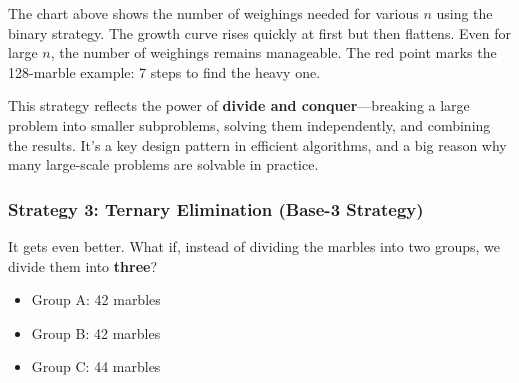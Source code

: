 \begin{center}
\end{center}

\noindent The chart above shows the number of weighings needed for various \( n \) using the binary strategy. The growth curve rises quickly at first but then flattens. Even for large \( n \), the number of weighings remains manageable. The red point marks the 128-marble example: 7 steps to find the heavy one.

\medskip

This strategy reflects the power of \textbf{divide and conquer}—breaking a large problem into smaller subproblems, solving them independently, and combining the results. It’s a key design pattern in efficient algorithms, and a big reason why many large-scale problems are solvable in practice.

\subsubsection{Strategy 3: Ternary Elimination (Base-3 Strategy)}

It gets even better. What if, instead of dividing the marbles into two groups, we divide them into \textbf{three}?

\begin{itemize}
  \item Group A: 42 marbles
  \item Group B: 42 marbles
  \item Group C: 44 marbles
\end{itemize}

